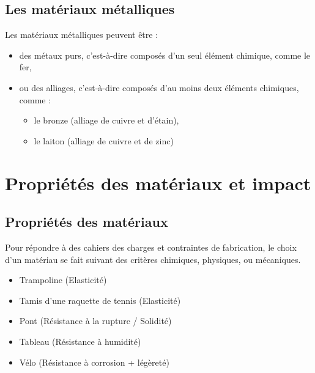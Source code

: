 \documentclass[a4paper,12pt]{article}
\begin{document}
\subsection{Les matériaux métalliques}

Les matériaux métalliques peuvent être :

\begin{itemize}[noitemsep]
    \item des métaux purs, c’est-à-dire composés d’un seul élément chimique, comme le fer,
    \item ou des alliages, c’est-à-dire composés d'au moins deux éléments chimiques, comme :
    \begin{itemize}[noitemsep]
        \item le bronze (alliage de cuivre et d’étain),
        \item le laiton (alliage de cuivre et de zinc)
    \end{itemize}
\end{itemize}


\section{Propriétés des matériaux et impact}

\subsection{Propriétés des matériaux}

Pour répondre à des cahiers des charges et contraintes de fabrication, le choix d'un matériau se fait suivant des critères chimiques, physiques, ou mécaniques.
\begin{itemize}[noitemsep]
\item Trampoline (Elasticité)
\item Tamis d'une raquette de tennis (Elasticité)
\item Pont (Résistance à la rupture / Solidité)
\item Tableau (Résistance à humidité)
\item Vélo (Résistance à corrosion + légèreté)

\end{itemize}
\end{document}
